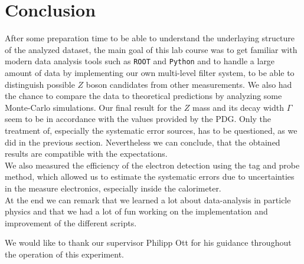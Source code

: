 \documentclass[twocolumn,
			   showpacs,%
               nofootinbib,
               aps,%
               prd,
               notitlepage,
               showkeys,
               10pt]{revtex4-1}
\begin{document}
\section{Conclusion}
After some preparation time to be able to understand the underlaying structure of the analyzed dataset, the main goal of this lab course was to get familiar with modern data analysis tools such as \verb|ROOT| and \verb|Python| and to handle a large amount of data by implementing our own multi-level filter system, to be able to distinguish possible $Z$ boson candidates from other measurements. We also had the chance to compare the data to theoretical predictions by analyzing some Monte-Carlo simulations. Our final result for the $Z$ mass and its decay width $\Gamma$ seem to be in accordance with the values provided by the PDG. Only the treatment of, especially the systematic error sources,  has to  be questioned, as we did in the previous section. Nevertheless we can conclude, that the obtained results are compatible with the expectations.\\
We also measured the efficiency of the electron detection using the tag and probe method, which allowed us to estimate the systematic errors due to uncertainties in the measure electronics, especially inside the calorimeter.\\

At the end we can remark that we learned a lot about data-analysis in particle physics and that we had a lot of fun working on the implementation and improvement of the different scripts.

 
\begin{acknowledgments}
We would like to thank our supervisor Philipp Ott for his guidance throughout the operation of this experiment.
\end{acknowledgments}



\nocite{*}
\end{document}
